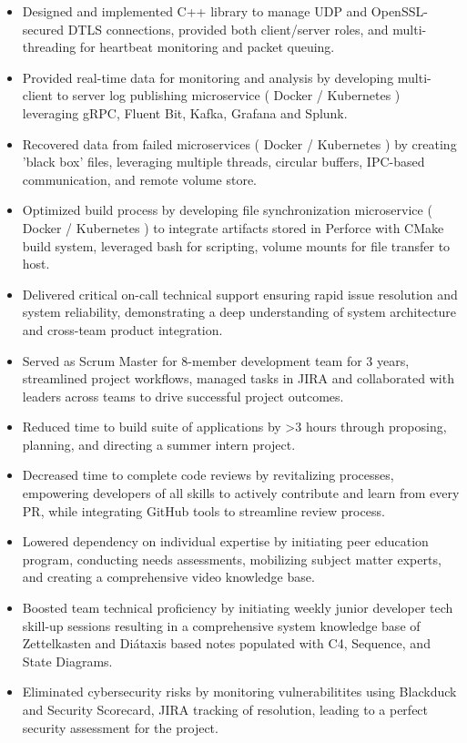 \documentclass[a4paper]{article}
\begin{document}
\begin{itemize} \itemsep 1pt
	\item Designed and implemented C++ library to manage UDP and OpenSSL-secured DTLS connections, provided both client/server roles, and multi-threading for heartbeat monitoring and packet queuing.
	\item Provided real-time data for monitoring and analysis by developing multi-client to server log publishing microservice ( Docker / Kubernetes ) leveraging gRPC, Fluent Bit, Kafka, Grafana and Splunk.
	\item Recovered data from failed microservices ( Docker / Kubernetes ) by creating 'black box' files, leveraging multiple threads, circular buffers, IPC-based communication, and remote volume store.
	\item Optimized build process by developing file synchronization microservice ( Docker / Kubernetes ) to integrate artifacts stored in Perforce with CMake build system, leveraged bash for scripting, volume mounts for file transfer to host.
	\item Delivered critical on-call technical support ensuring rapid issue resolution and system reliability, demonstrating a deep understanding of system architecture and cross-team product integration.
	\item Served as Scrum Master for 8-member development team for 3 years, streamlined project workflows, managed tasks in JIRA and collaborated with leaders across teams to drive successful project outcomes.
	\item Reduced time to build suite of applications by >3 hours through proposing, planning, and directing a summer intern project.
	\item Decreased time to complete code reviews by revitalizing processes, empowering developers of all skills to actively contribute and learn from every PR, while integrating GitHub tools to streamline review process.
	\item Lowered dependency on individual expertise by initiating peer education program, conducting needs assessments, mobilizing subject matter experts, and creating a comprehensive video knowledge base.
	\item Boosted team technical proficiency by initiating weekly junior developer tech skill-up sessions resulting in a comprehensive system knowledge base of Zettelkasten and Diátaxis based notes populated with C4, Sequence, and State Diagrams.
	\item Eliminated cybersecurity risks by monitoring vulnerabilitites using Blackduck and Security Scorecard, JIRA tracking of resolution, leading to a perfect security assessment for the project.
\end{itemize}
\end{document}
